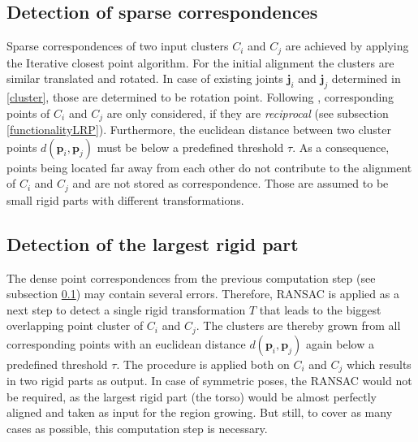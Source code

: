 \subsection{Detection of sparse correspondences}
\label{correspondences}

Sparse correspondences of two input clusters $C_i$ and $C_j$ are achieved by applying the Iterative closest point algorithm. For the initial alignment the clusters are similar translated and rotated. In case of existing joints $\boldsymbol{j}_i$ and $\boldsymbol{j}_j$ determined in \ref{cluster}, those are determined to be rotation point. Following , corresponding points of $C_i$ and $C_j$ are only considered, if they are \textit{reciprocal} (see subsection \ref{functionalityLRP}). Furthermore, the euclidean distance between two cluster points $d(\boldsymbol{p}_i,\boldsymbol{p}_j)$ must be below a predefined threshold $\tau$. As a consequence, points being located far away from each other do not contribute to the alignment of $C_i$ and $C_j$ and are not stored as correspondence. Those are assumed to be small rigid parts with different transformations.

\subsection{Detection of the largest rigid part}
\label{detectionLRP}
The dense point correspondences from the previous computation step (see subsection \ref{correspondences}) may contain several errors. Therefore, RANSAC is applied as a next step to detect a single rigid transformation $T$ that leads to the biggest overlapping point cluster of $C_i$ and $C_j$. The clusters are thereby grown from all corresponding points with an euclidean distance $d(\boldsymbol{p}_i,\boldsymbol{p}_j)$ again below a predefined threshold $\tau$. The procedure is applied both on $C_i$ and $C_j$ which results in two rigid parts as output. In case of symmetric poses, the RANSAC would not be required, as the largest rigid part (the torso) would be almost perfectly aligned and taken as input for the region growing. But still, to cover as many cases as possible, this computation step is necessary. 

